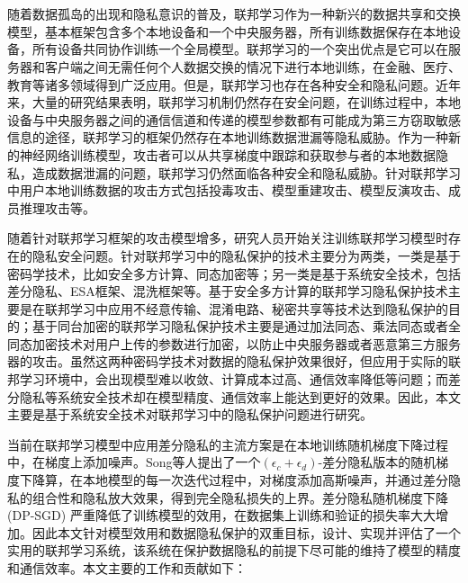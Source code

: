 \vspace{-2.5cm}
\chapter*{}

随着数据孤岛的出现和隐私意识的普及，联邦学习作为一种新兴的数据共享和交换模型，基本框架包含多个本地设备和一个中央服务器，所有训练数据保存在本地设备，所有设备共同协作训练一个全局模型。联邦学习的一个突出优点是它可以在服务器和客户端之间无需任何个人数据交换的情况下进行本地训练，在金融、医疗、教育等诸多领域得到广泛应用。但是，联邦学习也存在各种安全和隐私问题。近年来，大量的研究结果表明，联邦学习机制仍然存在安全问题，在训练过程中，本地设备与中央服务器之间的通信信道和传递的模型参数都有可能成为第三方窃取敏感信息的途径，联邦学习的框架仍然存在本地训练数据泄漏等隐私威胁。作为一种新的神经网络训练模型，攻击者可以从共享梯度中跟踪和获取参与者的本地数据隐私，造成数据泄漏的问题，联邦学习仍然面临各种安全和隐私威胁。针对联邦学习中用户本地训练数据的攻击方式包括投毒攻击、模型重建攻击、模型反演攻击、成员推理攻击等。

随着针对联邦学习框架的攻击模型增多，研究人员开始关注训练联邦学习模型时存在的隐私安全问题。针对联邦学习中的隐私保护的技术主要分为两类，一类是基于密码学技术，比如安全多方计算、同态加密等；另一类是基于系统安全技术，包括差分隐私、ESA框架、混洗框架等。基于安全多方计算的联邦学习隐私保护技术主要是在联邦学习中应用不经意传输、混淆电路、秘密共享等技术达到隐私保护的目的；基于同台加密的联邦学习隐私保护技术主要是通过加法同态、乘法同态或者全同态加密技术对用户上传的参数进行加密，以防止中央服务器或者恶意第三方服务器的攻击。虽然这两种密码学技术对数据的隐私保护效果很好，但应用于实际的联邦学习环境中，会出现模型难以收敛、计算成本过高、通信效率降低等问题；而差分隐私等系统安全技术却在模型精度、通信效率上能达到更好的效果。因此，本文主要是基于系统安全技术对联邦学习中的隐私保护问题进行研究。

当前在联邦学习模型中应用差分隐私的主流方案是在本地训练随机梯度下降过程中，在梯度上添加噪声。Song等人提出了一个$\left(\epsilon_{c}+\epsilon_{d}\right)$-差分隐私版本的随机梯度下降算，在本地模型的每一次迭代过程中，对梯度添加高斯噪声，并通过差分隐私的组合性和隐私放大效果，得到完全隐私损失的上界。差分隐私随机梯度下降 (DP-SGD) 严重降低了训练模型的效用，在数据集上训练和验证的损失率大大增加。因此本文针对模型效用和数据隐私保护的双重目标，设计、实现并评估了一个实用的联邦学习系统，该系统在保护数据隐私的前提下尽可能的维持了模型的精度和通信效率。本文主要的工作和贡献如下：

